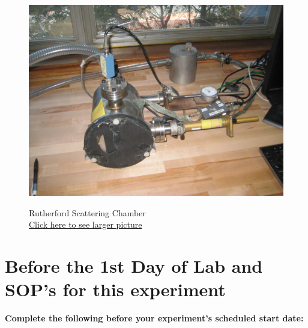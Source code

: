 \documentclass{../lab}
\begin{document}
\begin{figure}[!h]
  \label{fig:Valve}
\endminipage\hfill
{}
  \href{http://experimentationlab.berkeley.edu/sites/default/files/images/RUT_Chamber.jpg}{\includegraphics[width=\linewidth,keepaspectratio]{images/RUT_Chamber.jpg}}
  \caption{Rutherford Scattering Chamber \\ \href{http://experimentationlab.berkeley.edu/sites/default/files/images/RUT_Chamber.jpg}{Click here to see larger picture}}\label{fig:RUTChamber}
\endminipage
\end{figure}

\section{Before the 1st Day of Lab and SOP's for this experiment}

\textbf{Complete the following before your experiment's scheduled start date:}
\end{document}
